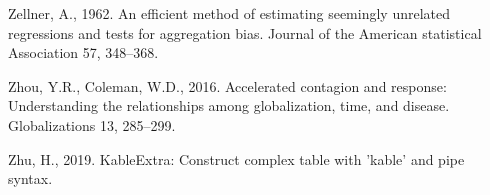 \documentclass[]{elsarticle} %
\begin{document}
\leavevmode\hypertarget{ref-Zellner1962efficient}{}%
Zellner, A., 1962. An efficient method of estimating seemingly unrelated
regressions and tests for aggregation bias. Journal of the American
statistical Association 57, 348--368.

\leavevmode\hypertarget{ref-Zhou2016accelerated}{}%
Zhou, Y.R., Coleman, W.D., 2016. Accelerated contagion and response:
Understanding the relationships among globalization, time, and disease.
Globalizations 13, 285--299.

\leavevmode\hypertarget{ref-Zhu2019}{}%
Zhu, H., 2019. KableExtra: Construct complex table with 'kable' and pipe
syntax.
\end{document}
